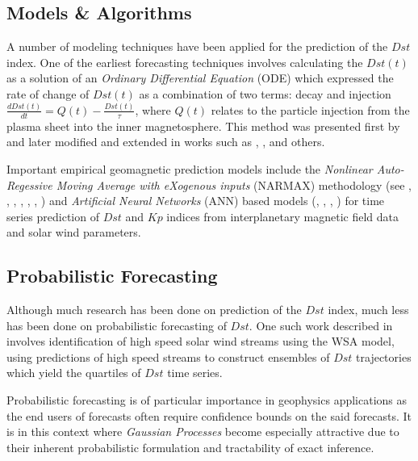 \documentclass{article}
\begin{document}
\subsection{Models \& Algorithms}

A number of modeling techniques have been applied for the prediction
of the $Dst$ index. One of the earliest forecasting techniques
involves calculating the $Dst(t)$ as a solution of an \emph{Ordinary
  Differential Equation} (ODE) which expressed the rate of change of
$Dst(t)$ as a combination of two terms: decay and injection $\frac{d
  Dst(t)}{dt} = Q(t) - \frac{Dst(t)}{\tau}$, where $Q(t)$ relates to
the particle injection from the plasma sheet into the inner
magnetosphere. This method was presented first by \citet{JGR:JGR10260}
and later modified and extended in works such as \citet{Wang:Dst},
\citet{JGRA:JGRA14856}, \citet{Ballatore2014} and others.

Important empirical geomagnetic prediction models include the
\emph{Nonlinear Auto-Regessive Moving Average with eXogenous inputs}
(NARMAX) methodology (see \citet{doi:10.1080/00207178908559767},
\citet{GRL:GRL13494}, \citet{GRL:GRL20944}, \citet{JGRA:JGRA18657},
\citet{balikhin:narmax}, \citet{JGRA:JGRA20661},
\citet{JGRA:JGRA50192}) and \emph{Artificial Neural Networks} (ANN)
based models (\citet{Lund}, \citet{JGRA:JGRA17461},
\citet{SWE:SWE286}, \citet{pallocchia:hal-00318011}) for time series
prediction of $Dst$ and $Kp$ indices from interplanetary magnetic
field data and solar wind parameters. 

\subsection{Probabilistic Forecasting}
Although much research has been done on prediction of the $Dst$ index,
much less has been done on probabilistic forecasting of $Dst$. One
such work described in \citet{McPherron:2013} involves identification
of high speed solar wind streams using the WSA model, using
predictions of high speed streams to construct ensembles of $Dst$
trajectories which yield the quartiles of $Dst$ time series. 

Probabilistic forecasting is of particular importance in geophysics
applications as the end users of forecasts often require confidence
bounds on the said forecasts. It is in this context where
\emph{Gaussian Processes} become especially attractive due to their
inherent probabilistic formulation and tractability of exact inference.
\end{document}
